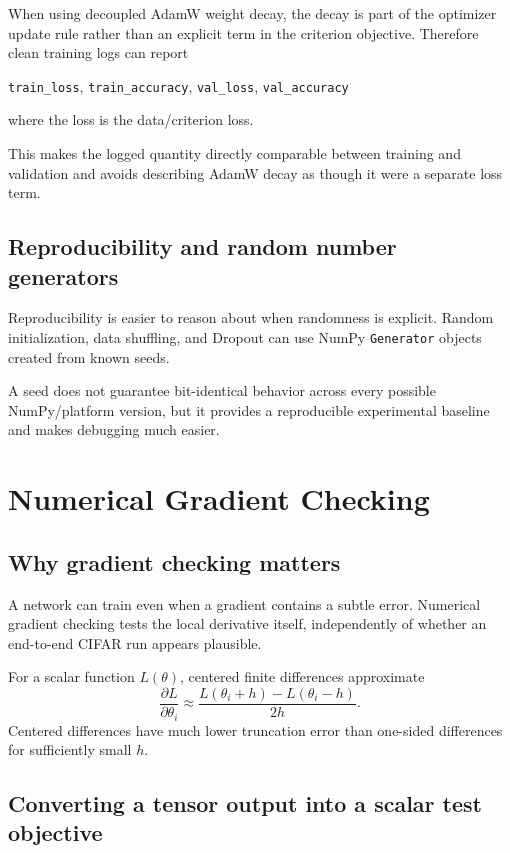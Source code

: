 \documentclass[11pt,a4paper]{article}
\newcommand{\pd}[2]{\frac{\partial #1}{\partial #2}}
\newcommand{\code}[1]{\texttt{#1}}
\begin{document}
When using decoupled AdamW weight decay, the decay is part of the optimizer update rule rather than an explicit term in the criterion objective. Therefore clean training logs can report
\begin{center}
\code{train\_loss}, \code{train\_accuracy}, \code{val\_loss}, \code{val\_accuracy}
\end{center}
where the loss is the data/criterion loss.

This makes the logged quantity directly comparable between training and validation and avoids describing AdamW decay as though it were a separate loss term.

\subsection{Reproducibility and random number generators}

Reproducibility is easier to reason about when randomness is explicit. Random initialization, data shuffling, and Dropout can use NumPy \code{Generator} objects created from known seeds.

A seed does not guarantee bit-identical behavior across every possible NumPy/platform version, but it provides a reproducible experimental baseline and makes debugging much easier.

\section{Numerical Gradient Checking}

\subsection{Why gradient checking matters}

A network can train even when a gradient contains a subtle error. Numerical gradient checking tests the local derivative itself, independently of whether an end-to-end CIFAR run appears plausible.

For a scalar function $L(\theta)$, centered finite differences approximate
\[
\boxed{
\pd{L}{\theta_i}
\approx
\frac{L(\theta_i+h)-L(\theta_i-h)}{2h}
}.
\]
Centered differences have much lower truncation error than one-sided differences for sufficiently small $h$.

\subsection{Converting a tensor output into a scalar test objective}
\end{document}
